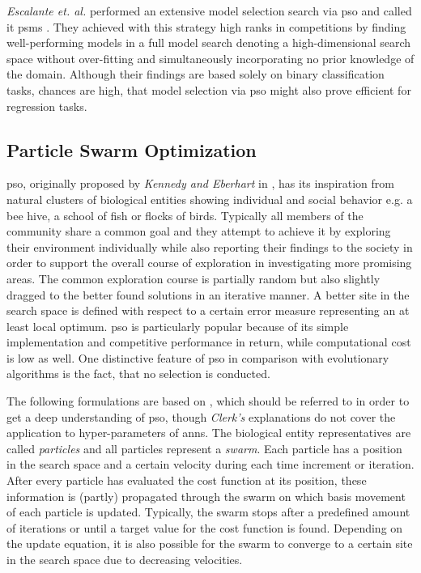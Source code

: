 \textit{Escalante et. al.} performed an extensive model selection search via \gls{pso} and called it \gls{psms} \cite{EsMo2009}.
They achieved with this strategy high ranks in competitions by finding well-performing models in a full model search denoting a high-dimensional search space without over-fitting and simultaneously incorporating no prior knowledge of the domain.
Although their findings are based solely on binary classification tasks, chances are high, that model selection via \gls{pso} might also prove efficient for regression tasks.

\subsection{Particle Swarm Optimization}
\gls{pso}, originally proposed by \textit{Kennedy and Eberhart} in \cite{KeEb1995}, has its inspiration from natural clusters of biological entities showing individual and social behavior e.g. a bee hive, a school of fish or flocks of birds. Typically all members of the community share a common goal and they attempt to achieve it by exploring their environment individually while also reporting their findings to the society in order to support the overall course of exploration in investigating more promising areas.
The common exploration course is partially random but also slightly dragged to the better found solutions in an iterative manner.
A better site in the search space is defined with respect to a certain error measure representing an at least local optimum.
\gls{pso} is particularly popular because of its simple implementation and competitive performance in return, while computational cost is low as well.
One distinctive feature of \gls{pso} in comparison with evolutionary algorithms is the fact, that no selection is conducted.

The following formulations are based on \cite{Clerc2006}, which should be referred to in order to get a deep understanding of \gls{pso},
though \textit{Clerk's} explanations do not cover the application to hyper-parameters of \glspl{ann}.
The biological entity representatives are called \textit{particles} and all particles represent a \textit{swarm}.
Each particle has a position in the search space and a certain velocity during each time increment or iteration.
After every particle has evaluated the cost function at its position, these information is (partly) propagated through the swarm on which basis movement of each particle is updated.
Typically, the swarm stops after a predefined amount of iterations or until a target value for the cost function is found.
Depending on the update equation, it is also possible for the swarm to converge to a certain site in the search space due to decreasing velocities.

